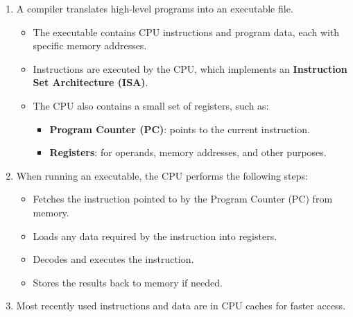 \begin{enumerate}[parsep=1em]
   \item A compiler translates high-level programs into an executable file.

   \begin{itemize}[parsep=0.5em]
      \item The executable contains CPU instructions and program data, each with specific memory addresses.
      \item Instructions are executed by the CPU, which implements an \textbf{Instruction Set Architecture (ISA)}.
      \item The CPU also contains a small set of registers, such as:
      \begin{itemize}
         \item \textbf{Program Counter (PC)}: points to the current instruction.
         \item \textbf{Registers}: for operands, memory addresses, and other purposes.
      \end{itemize}
   \end{itemize}

   \item When running an executable, the CPU performs the following steps:
   \begin{itemize}[parsep=0.5em]
      \item Fetches the instruction pointed to by the Program Counter (PC) from memory.
      \item Loads any data required by the instruction into registers.
      \item Decodes and executes the instruction.
      \item Stores the results back to memory if needed.
   \end{itemize}

   \item Most recently used instructions and data are in CPU caches for faster access.
\end{enumerate}


